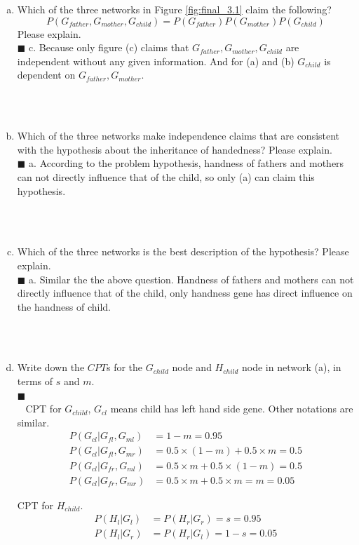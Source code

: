 \documentclass{article}
\newcommand{\solution}[1]{~\\ $\blacksquare$ \sffamily\upshape\selectfont #1
\normalfont ~\\~ }
\begin{document}
\begin{enumerate}[(a)]
\item Which of the three networks in Figure \ref{fig:final_3.1} claim
  the following?
  \[ P(G_{father}, G_{mother}, G_{child}) =
  P(G_{father})P(G_{mother})P(G_{child}) \]
  Please explain.
\solution{
  c. Because only figure (c) claims that $G_{father}, G_{mother},
  G_{child}$ are independent without any given information. And for
  (a) and (b) $G_{child}$ is dependent on $G_{father}, G_{mother}$. 
}
\item Which of the three networks make independence claims that are
  consistent with the hypothesis about the inheritance of handedness?
  Please explain.
\solution{
  a. According to the problem hypothesis, handness of fathers and
  mothers can not directly influence that of the child, so only (a)
  can claim this hypothesis. 
}
\item Which of the three networks is the best description of the
  hypothesis? Please explain.
\solution{
  a. Similar the the above question. Handness of fathers and
  mothers can not directly influence that of the child, only handness
  gene has direct influence on the handness of child.
}
\item Write down the $CPT$s for the $G_{child}$ node and $H_{child}$ node in
  network (a), in terms of $s$ and $m$.
  \solution{}
    CPT for $G_{child}$, $G_{cl}$ means child has left hand side
    gene. Other notations are similar. 
    \begin{align*}
      P(G_{cl}|G_{fl},G_{ml}) & = 1-m = 0.95\\
      P(G_{cl}|G_{fl},G_{mr}) & = 0.5\times (1-m) + 0.5\times m = 0.5 \\ 
      P(G_{cl}|G_{fr},G_{ml}) & = 0.5\times m + 0.5\times (1-m) = 0.5 \\ 
      P(G_{cl}|G_{fr},G_{mr}) & = 0.5\times m + 0.5\times m = m = 0.05 
    \end{align*}

    CPT for $H_{child}$. 
    \begin{align*}
      P(H_l|G_l) & = P(H_r|G_r) = s = 0.95 \\ 
      P(H_l|G_r) & = P(H_r|G_l) = 1-s = 0.05 \\ 
    \end{align*}


\end{enumerate}
\end{document}
